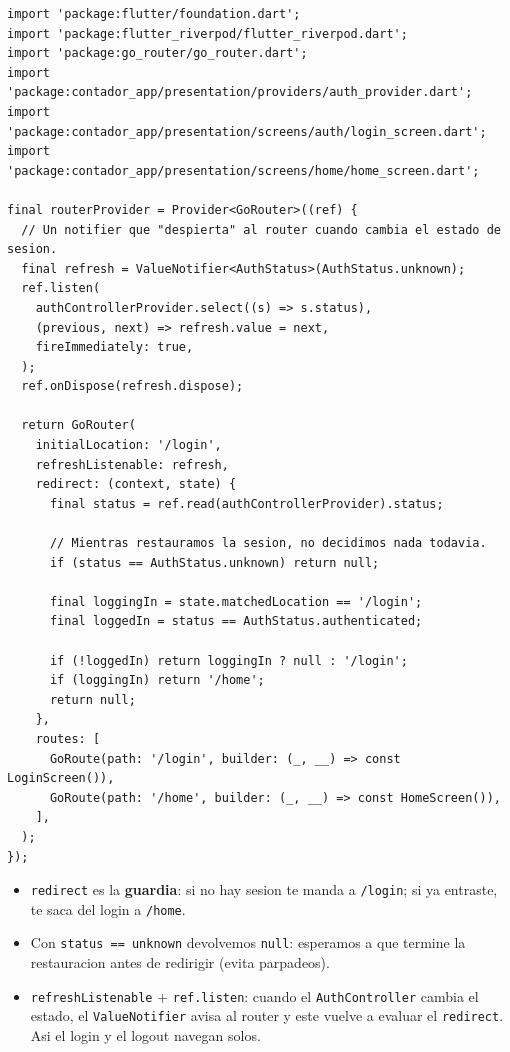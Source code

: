 \documentclass[11pt,a4paper,oneside]{book}
\begin{document}
\begin{lstlisting}
import 'package:flutter/foundation.dart';
import 'package:flutter_riverpod/flutter_riverpod.dart';
import 'package:go_router/go_router.dart';
import 'package:contador_app/presentation/providers/auth_provider.dart';
import 'package:contador_app/presentation/screens/auth/login_screen.dart';
import 'package:contador_app/presentation/screens/home/home_screen.dart';

final routerProvider = Provider<GoRouter>((ref) {
  // Un notifier que "despierta" al router cuando cambia el estado de sesion.
  final refresh = ValueNotifier<AuthStatus>(AuthStatus.unknown);
  ref.listen(
    authControllerProvider.select((s) => s.status),
    (previous, next) => refresh.value = next,
    fireImmediately: true,
  );
  ref.onDispose(refresh.dispose);

  return GoRouter(
    initialLocation: '/login',
    refreshListenable: refresh,
    redirect: (context, state) {
      final status = ref.read(authControllerProvider).status;

      // Mientras restauramos la sesion, no decidimos nada todavia.
      if (status == AuthStatus.unknown) return null;

      final loggingIn = state.matchedLocation == '/login';
      final loggedIn = status == AuthStatus.authenticated;

      if (!loggedIn) return loggingIn ? null : '/login';
      if (loggingIn) return '/home';
      return null;
    },
    routes: [
      GoRoute(path: '/login', builder: (_, __) => const LoginScreen()),
      GoRoute(path: '/home', builder: (_, __) => const HomeScreen()),
    ],
  );
});
\end{lstlisting}

\begin{whatbox}
\begin{itemize}
  \item \texttt{redirect} es la \textbf{guardia}: si no hay sesion te manda a
        \texttt{/login}; si ya entraste, te saca del login a \texttt{/home}.
  \item Con \texttt{status == unknown} devolvemos \texttt{null}: esperamos a que
        termine la restauracion antes de redirigir (evita parpadeos).
  \item \texttt{refreshListenable} + \texttt{ref.listen}: cuando el
        \texttt{AuthController} cambia el estado, el \texttt{ValueNotifier} avisa al
        router y este vuelve a evaluar el \texttt{redirect}. Asi el login y el
        logout navegan solos.
\end{itemize}
\end{whatbox}
\end{document}
